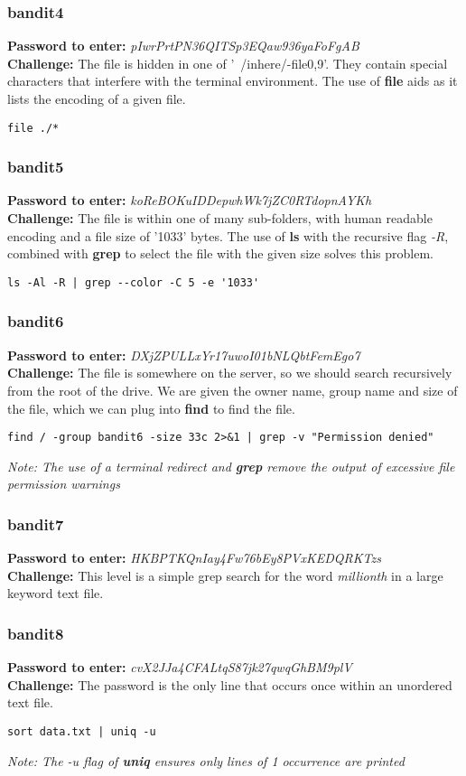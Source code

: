 \documentclass[a4paper]{article}
\newcommand{\pass}[1]{\textbf{Password to enter:} \textit{#1}\\}
\newcommand{\chall}{\textbf{Challenge:} }
\begin{document}
\subsubsection{bandit4}
\pass{pIwrPrtPN36QITSp3EQaw936yaFoFgAB}
\chall The file is hidden in one of '~/inhere/-file{0,9}'. They contain special characters that interfere with the terminal environment. The use of \textbf{file} aids as it lists the encoding of a given file.
\begin{lstlisting}
file ./*
\end{lstlisting}

\subsubsection{bandit5}
\pass{koReBOKuIDDepwhWk7jZC0RTdopnAYKh}
\chall The file is within one of many sub-folders, with human readable encoding and a file size of '1033' bytes. The use of \textbf{ls} with the recursive flag \textit{-R}, combined with \textbf{grep} to select the file with the given size solves this problem.
\begin{lstlisting}
ls -Al -R | grep --color -C 5 -e '1033'
\end{lstlisting}

\subsubsection{bandit6}
\pass{DXjZPULLxYr17uwoI01bNLQbtFemEgo7}
\chall The file is somewhere on the server, so we should search recursively from the root of the drive. We are given the owner name, group name and size of the file, which we can plug into \textbf{find} to find the file.
\begin{lstlisting}
find / -group bandit6 -size 33c 2>&1 | grep -v "Permission denied"
\end{lstlisting}
\textit{Note: The use of a terminal redirect and \textbf{grep} remove the output of excessive file permission warnings}

\subsubsection{bandit7}
\pass{HKBPTKQnIay4Fw76bEy8PVxKEDQRKTzs}
\chall This level is a simple grep search for the word \textit{millionth} in a large keyword text file.

\subsubsection{bandit8}
\pass{cvX2JJa4CFALtqS87jk27qwqGhBM9plV}
\chall The password is the only line that occurs once within an unordered text file.
\begin{lstlisting}
sort data.txt | uniq -u
\end{lstlisting}
\textit{Note: The -u flag of \textbf{uniq} ensures only lines of 1 occurrence are printed}
\end{document}
